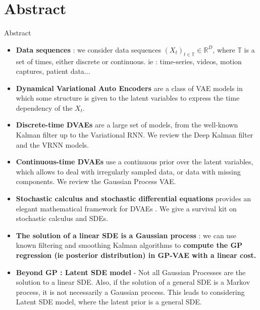 \section{Abstract}\label{Abstract}

\begin{frame}{Abstract}
    \begin{itemize}
        \item <1-> \textbf{Data sequences} : we consider data sequences $(X_t)_{t \in \mathbb{T}} \in \mathbb{R}^D$, where $\mathbb{T}$ is a set of times, either discrete or continuous. ie : time-series, videos, motion captures, patient data...
        \item <2-> \textbf{Dynamical Variational Auto Encoders} \cite{girin_dynamical_2022} are a class of VAE models in which some structure is given to the latent variables to express the time dependency of the $X_t$.
        \item <3-> \textbf{Discrete-time DVAEs} are a large set of models, from the well-known Kalman filter up to the Variational RNN. We review the Deep Kalman filter and the VRNN models.
        \item <4-> \textbf{Continuous-time DVAEs} use a continuous prior over the latent variables, which allows to deal with irregularly sampled data, or data with missing components. We review the Gaussian Process VAE.
        \item <5-> \textbf{Stochastic calculus and stochastic differential equations} provides an elegant mathematical framework for DVAEs \cite{noauthor_gaussian_nodate} \cite{sarkka_applied_2019}. We give a survival kit on stochastic calculus and SDEs.
        \item <6-> \textbf{The solution of a linear SDE is a Gaussian process} \cite{rasmussen_gaussian_2008}: we can use known filtering and smoothing Kalman algorithms to \textbf{compute the GP regression (ie posterior distribution) in GP-VAE with a linear cost.}
        \item <7-> \textbf{Beyond GP : Latent SDE model} - Not all Gaussian Processes are the solution to a linear SDE. Also, if the solution of a general SDE is a Markov process, it is not necessarily a Gaussian process. This leads to considering Latent SDE model, where the latent prior is a general SDE.
    \end{itemize}
\end{frame}